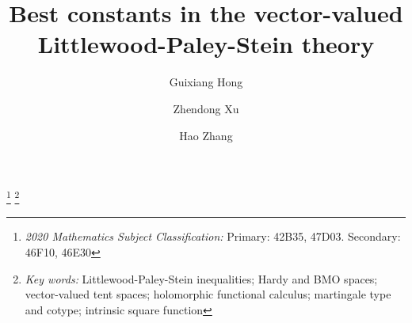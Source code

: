 \documentclass[oneside,english,a4wide]{amsart}
\numberwithin{equation}{section}
\numberwithin{figure}{section}
\theoremstyle{plain}
\theoremstyle{plain}
\theoremstyle{definition}
\theoremstyle{plain}
\theoremstyle{remark}
\theoremstyle{definition}
\theoremstyle{remark}
\theoremstyle{definition}
\newcommand{\8}{+\infty}
\renewcommand{\1}{\mathbbm{1}}
\begin{document}
\pagestyle{myheadings}
	
	
\title{Best constants in the vector-valued Littlewood-Paley-Stein theory}

\thanks{{\it 2020 Mathematics Subject Classification:} Primary: 42B35, 47D03. Secondary: 46F10, 46E30}
\thanks{{\it Key words:} Littlewood-Paley-Stein inequalities; Hardy and BMO spaces; vector-valued tent spaces; holomorphic functional calculus; martingale type and cotype; intrinsic square function}

\author[Guixiang Hong]{Guixiang Hong}
\address{Institute for Advanced Study in Mathematics, Harbin Institute of Technology,  Harbin 150001, China}

\author[Zhendong  Xu]{Zhendong Xu}
\address{%
	Laboratoire de Math{\'e}matiques, Universit{\'e} de Bourgogne Franche-Comt{\'e}, 25030 Besan\c{c}on Cedex, France}


\author[Hao Zhang]{Hao Zhang}
\address{%
Department of Mathematics, University of Illinois Urbana-Champaign, USA}
\date{}
\end{document}
